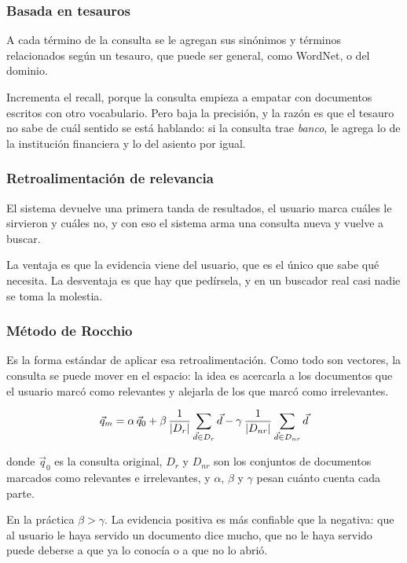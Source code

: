 \documentclass[11pt,letterpaper]{article}
\begin{document}
\subsubsection*{Basada en tesauros}

A cada término de la consulta se le agregan sus sinónimos y términos
relacionados según un tesauro, que puede ser general, como WordNet, o
del dominio.

Incrementa el recall, porque la consulta empieza a empatar con
documentos escritos con otro vocabulario. Pero baja la precisión, y la
razón es que el tesauro no sabe de cuál sentido se está hablando: si la
consulta trae \emph{banco}, le agrega lo de la institución financiera y
lo del asiento por igual.

\subsubsection*{Retroalimentación de relevancia}

El sistema devuelve una primera tanda de resultados, el usuario marca
cuáles le sirvieron y cuáles no, y con eso el sistema arma una consulta
nueva y vuelve a buscar.

La ventaja es que la evidencia viene del usuario, que es el único que
sabe qué necesita. La desventaja es que hay que pedírsela, y en un
buscador real casi nadie se toma la molestia.

\subsubsection*{Método de Rocchio}

Es la forma estándar de aplicar esa retroalimentación. Como todo son
vectores, la consulta se puede mover en el espacio: la idea es
acercarla a los documentos que el usuario marcó como relevantes y
alejarla de los que marcó como irrelevantes.

\[
    \vec{q}_m = \alpha\, \vec{q}_0
    + \beta\, \frac{1}{\left\lvert D_r \right\rvert} \sum_{\vec{d} \in D_r} \vec{d}
    - \gamma\, \frac{1}{\left\lvert D_{nr} \right\rvert} \sum_{\vec{d} \in D_{nr}} \vec{d}
\]

donde $\vec{q}_0$ es la consulta original, $D_r$ y $D_{nr}$ son los
conjuntos de documentos marcados como relevantes e irrelevantes, y
$\alpha$, $\beta$ y $\gamma$ pesan cuánto cuenta cada parte.

\begin{ojo}
    En la práctica $\beta > \gamma$. La evidencia positiva es más
    confiable que la negativa: que al usuario le haya servido un
    documento dice mucho, que no le haya servido puede deberse a que ya
    lo conocía o a que no lo abrió.
\end{ojo}
\end{document}
